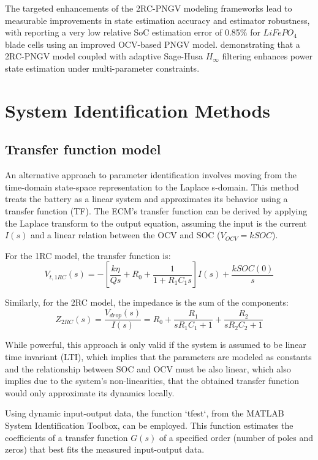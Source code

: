 \documentclass[lettersize,journal]{IEEEtran}
\begin{document}
The targeted enhancements of the 2RC-PNGV modeling frameworks lead to measurable improvements in state estimation accuracy and estimator robustness, with \cite{Tao2023} reporting a very low relative SoC estimation error of 0.85$\%$ for $LiFePO_4$ blade cells using an improved OCV-based PNGV model\cite{Tao2023,Xinyu2025}. demonstrating that a 2RC-PNGV model coupled with adaptive Sage-Husa $H_{\infty}$ filtering enhances power state estimation under multi-parameter constraints\cite{Xinyu2025}.

\section{System Identification Methods}

\subsection{Transfer function model}

An alternative approach to parameter identification involves moving from the time-domain state-space representation to the Laplace s-domain. This method treats the battery as a linear system and approximates its behavior using a transfer function (TF). The ECM's transfer function can be derived by applying the Laplace transform to the output equation, assuming the input is the current $I(s)$ and a linear relation between the OCV and SOC ($V_{OCV}=kSOC$).

For the 1RC model, the transfer function is:
\begin{equation}
	\label{eq:tf_1rc}
	V_{t,1RC}(s) = -\left[\frac{k\eta}{Qs}+R_0+\frac{1}{1+R_1C_1s}\right]I(s)+ \frac{kSOC(0)}{s}
\end{equation}

Similarly, for the 2RC model, the impedance is the sum of the components:
\begin{equation}
	\label{eq:tf_2rc}
	Z_{2RC}(s) = \frac{V_{drop}(s)}{I(s)} = R_0 + \frac{R_1}{sR_1C_1 + 1} + \frac{R_2}{sR_2C_2 + 1}
\end{equation}

While powerful, this approach is only valid if the system is assumed to be linear time invariant (LTI), which implies that the parameters are modeled as constants and the relationship between SOC and OCV must be also linear, which also implies due to the system's non-linearities, that the obtained transfer function would only approximate its dynamics locally.

Using dynamic input-output data, the function `tfest`, from the MATLAB System Identification Toolbox,  can be employed. This function estimates the coefficients of a transfer function $G(s)$ of a specified order (number of poles and zeros) that best fits the measured input-output data.
\end{document}
